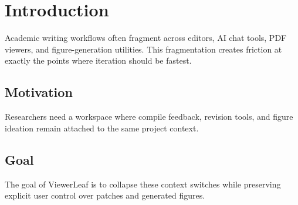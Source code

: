 \section{Introduction}
Academic writing workflows often fragment across editors, AI chat tools, PDF viewers, and figure-generation utilities. This fragmentation creates friction at exactly the points where iteration should be fastest.

\subsection{Motivation}
Researchers need a workspace where compile feedback, revision tools, and figure ideation remain attached to the same project context.

\subsection{Goal}
The goal of ViewerLeaf is to collapse these context switches while preserving explicit user control over patches and generated figures.
